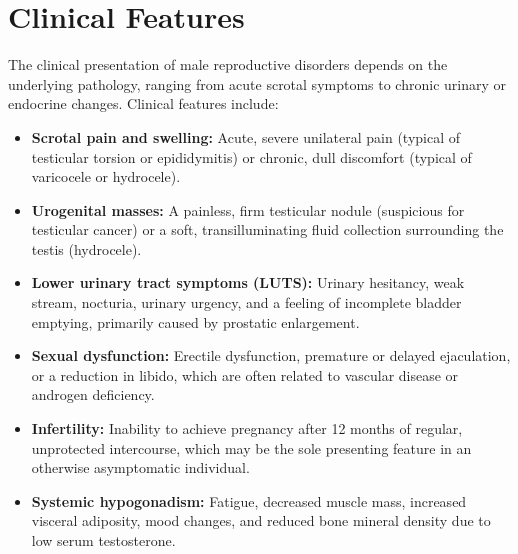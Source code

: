 \section*{Clinical Features}
The clinical presentation of male reproductive disorders depends on the underlying pathology, ranging from acute scrotal symptoms to chronic urinary or endocrine changes. Clinical features include:
\begin{itemize}
    \item \textbf{Scrotal pain and swelling:} Acute, severe unilateral pain (typical of testicular torsion or epididymitis) or chronic, dull discomfort (typical of varicocele or hydrocele).
    \item \textbf{Urogenital masses:} A painless, firm testicular nodule (suspicious for testicular cancer) or a soft, transilluminating fluid collection surrounding the testis (hydrocele).
    \item \textbf{Lower urinary tract symptoms (LUTS):} Urinary hesitancy, weak stream, nocturia, urinary urgency, and a feeling of incomplete bladder emptying, primarily caused by prostatic enlargement.
    \item \textbf{Sexual dysfunction:} Erectile dysfunction, premature or delayed ejaculation, or a reduction in libido, which are often related to vascular disease or androgen deficiency.
    \item \textbf{Infertility:} Inability to achieve pregnancy after 12 months of regular, unprotected intercourse, which may be the sole presenting feature in an otherwise asymptomatic individual.
    \item \textbf{Systemic hypogonadism:} Fatigue, decreased muscle mass, increased visceral adiposity, mood changes, and reduced bone mineral density due to low serum testosterone.
\end{itemize}

